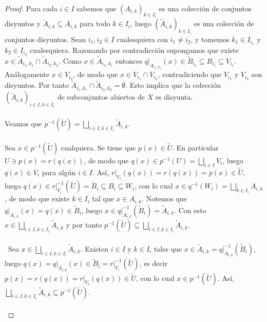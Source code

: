 \begin{proof}
   Para cada $i\in I$ sabemos que $\left( A_{i,k}\right)_{k\in I_i}$ es una colección de conjuntos disyuntos y $\widetilde{A}_{i,k}\subseteq A_{i,k}$ para todo $k\in I_i$, luego $\left( \widetilde{A}_{i,k}\right)_{k\in I_i}$ es una colección de conjuntos disyuntos. Sean $i_1,i_2\in I$ cualesquiera con $i_1\ne i_2$, y tomemos $k_1\in I_{i_1}$ y $k_2\in I_{i_2}$ cualesquiera. Razonando por contradicción supongamos que existe $x\in\widetilde{A}_{i_1,k_1}\cap\widetilde{A}_{i_2,k_2}$. Como $x\in\widetilde{A}_{i_1,k_1}$ entonces $\left.q\right|_{A_{i_1,k_1}}(x)\in\widetilde{B}_{i_1}\subseteq B_{i_1}\subseteq V_{i_1}$. Análogamente $x\in V_{i_2}$, de modo que $x\in V_{i_1}\cap V_{i_2}$, contradiciendo que $V_{i_1}$ y $V_{i_2}$ son disyuntos. Por tanto $\widetilde{A}_{i_1,k_1}\cap\widetilde{A}_{i_2,k_2}=\emptyset$. Esto implica que la colección $\left( \widetilde{A}_{i,k}\right)_{i\in I, k\in I_i}$ de subconjuntos abiertos de $X$ es disyunta.\\\\
   Veamos que $p^{-1}\left( \widetilde{U}\right)=\bigsqcup_{i\in I, k\in I_i}\widetilde{A}_{i,k}$.\\\\
   Sea $x\in p^{-1}\left( \widetilde{U}\right)$ cualquiera. Se tiene que $p(x)\in\widetilde{U}$. En particular $U\ni p(x)=r(q(x))$, de modo que $q(x)\in p^{-1}(U)=\bigsqcup_{i\in I}V_i$, luego $q(x)\in V_i$ para algún $i\in I$. Así, $\left.r\right|_{V_i}(q(x))=r(q(x))=p(x)\in \widetilde{U}$, luego $q(x)\in \left.r\right|_{V_i}^{-1}\left( \widetilde{U}\right)=\widetilde{B}_i\subseteq B_i\subseteq W_i$, con lo cual $x\in q^{-1}\left( W_i\right)=\bigsqcup_{k\in I_i}A_{i,k}$, de modo que existe $k\in I_i$ tal que $x\in A_{i,k}$. Notemos que $\left.q\right|_{A_{i,k}}(x)=q(x)\in\widetilde{B}_i$, luego $x\in \left.q\right|_{A_{i,k}}^{-1}\left( \widetilde{B}_i\right)=\widetilde{A}_{i,k}$. Con esto $x\in \bigsqcup_{i\in I, k\in I_i}\widetilde{A}_{i,k}$ y por tanto $p^{-1}\left( \widetilde{U}\right)\subseteq \bigsqcup_{i\in I, k\in I_i}\widetilde{A}_{i,k}$.\\\\\
   Sea $x\in \bigsqcup_{i\in I, k\in I_i}\widetilde{A}_{i,k}$. Existen $i\in I$ y $k\in I_i$ tales que $x\in \widetilde{A}_{i,k}=\left.q\right|_{A_{i,k}}^{-1}\left( \widetilde{B}_i\right)$, luego $q(x)=\left.q\right|_{A_{i,k}}(x)\in\widetilde{B}_i=\left.r\right|_{V_i}^{-1}\left( \widetilde{U}\right)$, es decir $p(x)=r(q(x))=\left.r\right|_{V_i}(q(x))\in \widetilde{U}$, con lo cual $x\in p^{-1}\left( \widetilde{U}\right)$. Así, $\bigsqcup_{i\in I, k\in I_i}\widetilde{A}_{i,k}\subseteq p^{-1}\left( \widetilde{U}\right)$.\\\\

\end{proof}
